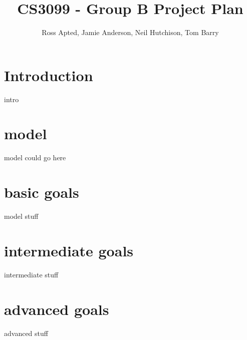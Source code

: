 \documentclass{article}
\begin{document}
\title{CS3099 - Group B Project Plan }
\author{Ross Apted, Jamie Anderson, Neil Hutchison, Tom Barry}
\maketitle

\section{Introduction}
intro

\section{model}
model could go here

\section{basic goals}
model stuff

\section{intermediate goals}
intermediate stuff 

\section{advanced  goals}
advanced stuff
\end{document}
